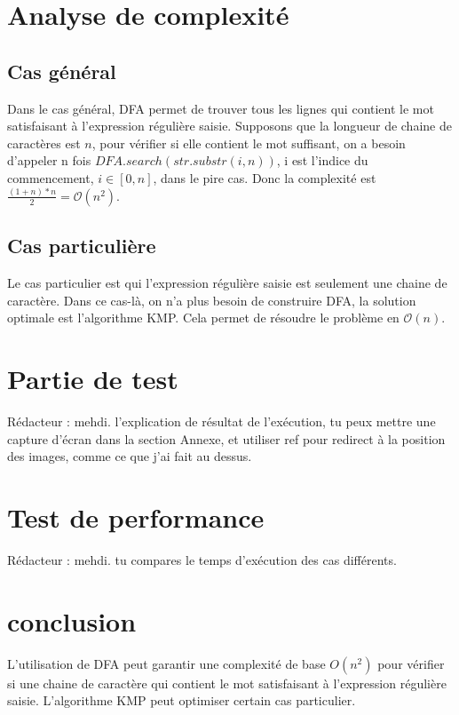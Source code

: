\documentclass[14px]{article}
\begin{document}
\section{Analyse de complexité}
\subsection{Cas général}
Dans le cas général, DFA permet de trouver tous les lignes qui contient le mot satisfaisant à l'expression régulière saisie. Supposons que la longueur de chaine de caractères est $n$, pour vérifier si elle contient le mot suffisant, on a besoin d'appeler n fois $DFA.search(str.substr(i, n))$, i est l'indice du commencement, $i \in [0, n]$, dans le pire cas. Donc la complexité est $\frac{(1 + n) * n}{2} = \mathcal{O}(n^{2})$.

\subsection{Cas particulière}
Le cas particulier est qui l'expression régulière saisie est seulement une chaine de caractère. Dans ce cas-là, on n'a plus besoin de construire DFA, la solution optimale est l'algorithme KMP. Cela permet de résoudre le problème en $\mathcal{O}(n)$.


\section{Partie de test}
Rédacteur : mehdi. l'explication de résultat de l'exécution, tu peux mettre une capture d'écran dans la section Annexe, et utiliser ref pour redirect à la position des images, comme ce que j'ai fait au dessus.

\section{Test de performance}
Rédacteur : mehdi. tu compares le temps d'exécution des cas différents.

\section{conclusion}
L'utilisation de DFA peut garantir une complexité de base $O(n^{2})$ pour vérifier si une chaine de caractère qui contient le mot satisfaisant à l'expression régulière saisie. L'algorithme KMP peut optimiser certain cas particulier.
\end{document}
